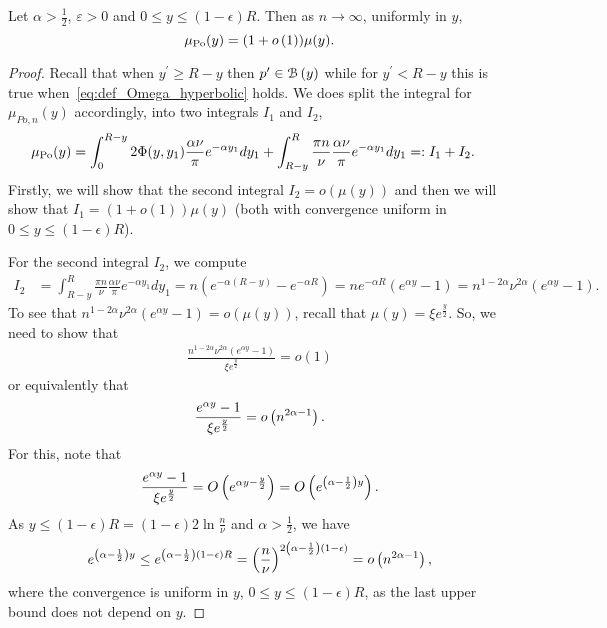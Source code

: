 \begin{lemma}\label{lem:average_degree_P_n}
Let $\alpha > \frac{1}{2}$, $\varepsilon >0$ and $0 \leq y \leq (1-\epsilon)R$. Then as $n \to \infty$, uniformly in $y$,
\[
	\mu_{{\mathrm{Po}}}(y) = (1+o\left(1\right)) \mu(y).
\]
\end{lemma}

\begin{proof}
Recall that when $y^\prime \ge R - y$ then $p^\prime \in {\mathcal B}\left(y\right)$ while for $y^\prime < R - y$ this is true when~\eqref{eq:def_Omega_hyperbolic} holds. We does split the integral for $\mu_{Po,n}(y)$ accordingly, into two integrals $I_1$ and $I_2$,
\begin{align*}
\mu_{{\mathrm{Po}}}(y) 
&= \int_0^{R-y} 2\Phi(y,y_1)\frac{\alpha\nu}{\pi}e^{-\alpha y_1} dy_1+\int_{R-y}^R \frac{\pi n}{\nu} \frac{\alpha \nu}{\pi}e^{-\alpha y_1}dy_1 =: I_1+I_2.
\end{align*}
Firstly, we will show that the second integral $I_2=o(\mu(y))$ and then we will show that $I_1 = (1+o(1))\mu(y)$ (both with  convergence uniform in $0\leq y\leq (1-\epsilon)R$).

For the second integral $I_2$, we compute
\begin{align*}
I_2 &= \int_{R-y}^R \frac{\pi n}{\nu} \frac{\alpha \nu}{\pi}e^{-\alpha y_1}dy_1 =n(e^{-\alpha(R-y)}-e^{-\alpha R}) =ne^{-\alpha R}(e^{\alpha y} -1) =n^{1-2\alpha}\nu^{2\alpha}(e^{\alpha y} -1). 	%
\end{align*}
To see that $n^{1-2\alpha}\nu^{2\alpha}(e^{\alpha y} -1) = o(\mu(y))$, recall that $\mu(y)=\xi e^{\frac{y}{2}}$. So, we need to show that
\begin{align*}
\frac{n^{1-2\alpha}\nu^{2\alpha}(e^{\alpha y} -1)}{\xi e^{\frac{y}{2}}} = o(1)
\end{align*}
or equivalently that
\begin{align*}
\frac{e^{\alpha y}-1}{\xi e^{\frac{y}{2}}}=o\left(n^{2\alpha-1}\right).
\end{align*}
For this, note that
\begin{align*}
\frac{e^{\alpha y}-1}{\xi e^{\frac{y}{2}}}=O\left(e^{\alpha y-\frac{y}{2}}\right) = O\left(e^{\left(\alpha-\frac{1}{2}\right)y}\right).
\end{align*}
As $y \leq (1-\epsilon)R =(1-\epsilon)2\ln \frac{n}{\nu}$ and $\alpha > \frac{1}{2}$, we have 
\[
	e^{\left(\alpha-\frac{1}{2}\right)y} \leq e^{\left(\alpha-\frac{1}{2}\right)(1-\epsilon)R} = \left(\frac{n}{\nu}\right)^{2\left(\alpha-\frac{1}{2}\right)(1-\epsilon)} = o\left(n^{2\alpha-1}\right),
\]
where the convergence is uniform in $y$, $0\leq y\leq (1-\epsilon)R$, as the last upper bound does not depend on $y$.


\end{proof}
